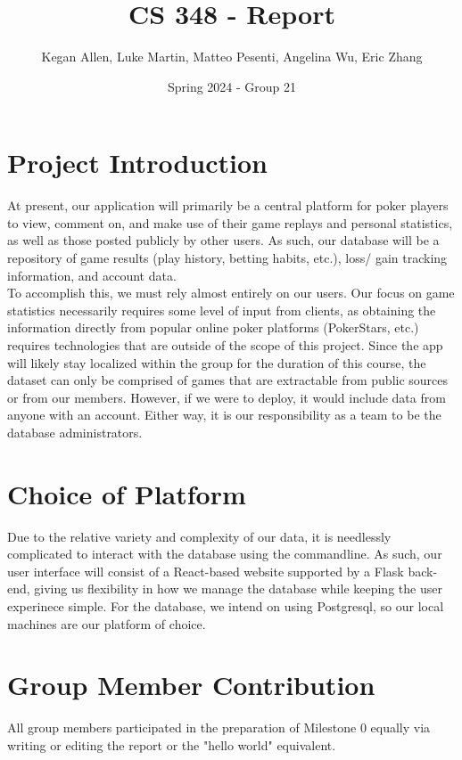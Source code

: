 \documentclass{article}
\title{CS 348 - Report}
\author{Kegan Allen, Luke Martin, Matteo Pesenti, Angelina Wu, Eric Zhang}
\date{Spring 2024 - Group 21}
\begin{document}
\maketitle

\section{Project Introduction}


At present, our application will primarily be a central platform for poker players to view, comment on, and make use of their game replays and personal statistics,
as well as those posted publicly by other users. As such, our database will be a repository of game results (play history, betting habits, etc.), loss/ gain
tracking information, and account data. \\

\noindent To accomplish this, we must rely almost entirely on our users. Our focus on game statistics necessarily requires some level of input from clients, 
as obtaining the information directly from popular online poker platforms (PokerStars, etc.) requires technologies that are outside of the scope of this project. 
Since the app will likely stay localized within the group for the duration of this course, the dataset can only be comprised of games that are extractable from public sources
or from our members. However, if we were to deploy, it would include data from anyone with an account. 
Either way, it is our responsibility as a team to be the database administrators.

\section{Choice of Platform}


Due to the relative variety and complexity of our data, it is needlessly complicated to interact with the database using the commandline.
As such, our user interface will consist of a React-based website supported by a Flask back-end, giving us flexibility in how we manage the database 
while keeping the user experinece simple. For the database, we intend on using Postgresql, so our local machines are our platform of choice.

\section{Group Member Contribution}

All group members participated in the preparation of Milestone 0 equally via writing or editing the report or the "hello world" equivalent.
\end{document}
